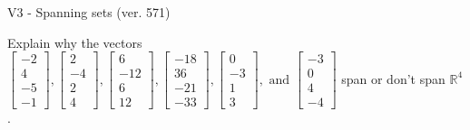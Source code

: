 \begin{exercise}
  \begin{exerciseTitle}V3 - Spanning sets (ver. 571)\end{exerciseTitle}
  \begin{exerciseStatement}
    Explain why the vectors \(\left[\begin{array}{r}
-2 \\
4 \\
-5 \\
-1
\end{array}\right] , \left[\begin{array}{r}
2 \\
-4 \\
2 \\
4
\end{array}\right] , \left[\begin{array}{r}
6 \\
-12 \\
6 \\
12
\end{array}\right] , \left[\begin{array}{r}
-18 \\
36 \\
-21 \\
-33
\end{array}\right] , \left[\begin{array}{r}
0 \\
-3 \\
1 \\
3
\end{array}\right] , \text{ and } \left[\begin{array}{r}
-3 \\
0 \\
4 \\
-4
\end{array}\right]\) span or don't span \(\mathbb{R}^4\). 
	



\end{exerciseStatement}
\end{exercise}
